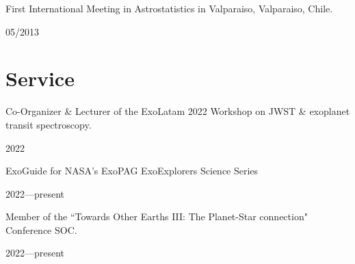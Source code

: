 \documentclass[12pt, a4paper]{article} %
\begin{document}
\begin{minipage}[t]{0.7\textwidth}
\begin{flushleft}%
  \setlength{\leftskip}{0.2cm}%
First International Meeting in Astrostatistics in Valparaiso, Valparaiso, Chile. 
\end{flushleft}
\end{minipage}
\begin{minipage}[t]{0.3\textwidth}
\hfill 05/2013
\end{minipage}

\section*{Service}

\begin{minipage}[t]{0.7\textwidth}
\begin{flushleft}%
  \setlength{\leftskip}{0.2cm}%
Co-Organizer \& Lecturer of the ExoLatam 2022 Workshop on JWST \& exoplanet transit spectroscopy.
\end{flushleft}
\end{minipage}
\begin{minipage}[t]{0.3\textwidth}
\hfill 2022
\end{minipage}

\vspace{0.2cm}

\begin{minipage}[t]{0.7\textwidth}
\begin{flushleft}%
  \setlength{\leftskip}{0.2cm}%
ExoGuide for NASA's ExoPAG ExoExplorers Science Series
\end{flushleft}
\end{minipage}
\begin{minipage}[t]{0.3\textwidth}
\hfill 2022---present
\end{minipage}

\vspace{0.2cm}


\begin{minipage}[t]{0.7\textwidth}
\begin{flushleft}%
  \setlength{\leftskip}{0.2cm}%
Member of the ``Towards Other Earths III: The Planet-Star connection" Conference SOC.
\end{flushleft}
\end{minipage}
\begin{minipage}[t]{0.3\textwidth}
\hfill 2022---present
\end{minipage}

\vspace{0.2cm}
\end{document}
